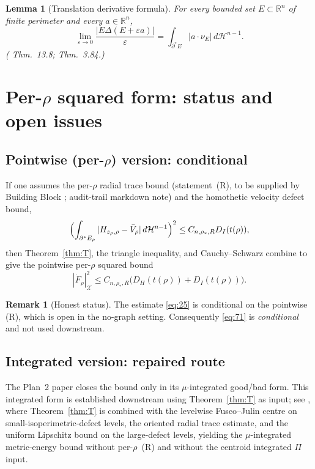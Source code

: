 \documentclass[11pt]{article}
\newtheorem{lemma}[theorem]{Lemma}
\theoremstyle{definition}
\newtheorem{remark}[theorem]{Remark}
\newcommand{\R}{\mathbb{R}}
\newcommand{\eps}{\varepsilon}
\newcommand{\rstar}{\rho_{*}}
\newcommand{\X}{\mathcal X}
\begin{document}
\begin{lemma}[Translation derivative formula]\label{lem:trans-deriv}
For every bounded set $E\subset\R^n$ of finite perimeter and every
$a\in\R^n$,
\begin{equation}\label{eq:trans-deriv}
   \lim_{\eps\to 0}\frac{|E\Delta(E+\eps a)|}{\eps}
   =\int_{\partial^*E}|a\cdot\nu_E|\,d\mathcal H^{n-1}.
\end{equation}
(\cite{Maggi2012} Thm.~13.8; \cite{AFP2000} Thm.~3.84.)
\end{lemma}

\section{Per-$\rho$ squared form: status and open issues}\label{sec:open}

\subsection{Pointwise (per-$\rho$) version: conditional}

If one assumes the per-$\rho$ radial trace bound (statement~(R), to be
supplied by Building Block \cite{WeightedMetricTrace}; audit-trail markdown
note) and the homothetic velocity defect bound,
\begin{equation}\label{eq:25}
   \Bigl(\int_{\partial^*E_\rho}|H_{z_\rho,\rho}-\bar V_\rho|
   \,d\mathcal H^{n-1}\Bigr)^2\le C_{n,\rstar,R}D_I(t(\rho)),
\end{equation}
then Theorem~\ref{thm:T}, the triangle inequality, and Cauchy--Schwarz
combine to give the pointwise per-$\rho$ squared bound
\begin{equation}\label{eq:71}
   |\dot F_\rho|_\X^2\le C_{n,\rstar,R}\bigl(D_H(t(\rho))+D_I(t(\rho))\bigr).
\end{equation}

\begin{remark}[Honest status]\label{rem:status}
The estimate \eqref{eq:25} is conditional on the pointwise (R), which is
open in the no-graph setting. Consequently \eqref{eq:71} is \emph{conditional}
and not used downstream.
\end{remark}

\subsection{Integrated version: repaired route}

The Plan~2 paper closes the bound only in its $\mu$-integrated good/bad
form.  This integrated form is established downstream using
Theorem~\ref{thm:T} as input; see \cite{WeightedMetricTrace}, where
Theorem~\ref{thm:T} is combined with the levelwise Fusco--Julin centre on
small-isoperimetric-defect levels, the oriented radial trace estimate, and
the uniform Lipschitz bound on the large-defect levels, yielding the
$\mu$-integrated metric-energy bound without per-$\rho$~(R) and without the
centroid integrated $\Pi$ input.
\end{document}
